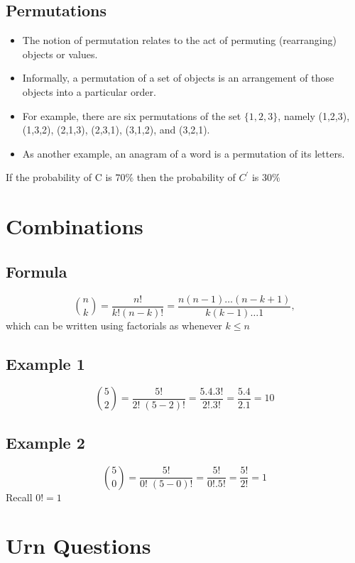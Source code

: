 \documentclass[12pt]{report}
\begin{document}
		\subsection{Permutations}
		\Large
		\begin{itemize}
			\item The notion of permutation relates to the act of permuting (rearranging) objects or values. 
			\item Informally, a permutation of a set of objects is an arrangement of those objects into a particular order. 
			
			\item For example, there are six permutations of the set $\{1,2,3\}$, namely (1,2,3), (1,3,2), (2,1,3), (2,3,1), (3,1,2), and (3,2,1). 
			\item As another example, an anagram of a word is a permutation of its letters. 
			
		\end{itemize}
		
If the probability of C is $70 \%$ then the probability of $C^{\prime}$ is $30\%$		

\section*{Combinations}

\subsection*{Formula}
\[ \binom nk  = \frac{n!}{k!(n-k)!} = \frac{n(n-1)\ldots(n-k+1)}{k(k-1)\dots 1},\]
which can be written using factorials as  whenever $k\leq n$

\subsection*{Example 1}

\[ \binom 5 2  = \frac{5!}{2!\;(5-2)!} = \frac{5.4.3!}{2! .3!} = \frac{5.4}{2.1} = 10\]

\subsection*{Example 2}

\[ \binom 5 0   = \frac{5!}{0!\;(5-0)!} = \frac{5!}{0! .5!} = \frac{5!}{2!} = 1\]
Recall $0! =1$
\section{Urn Questions}	
\end{document}
